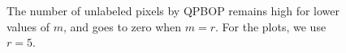 \documentclass[runningheads]{llncs}
\begin{document}
\begin{figure}[!htp]
\center
{}%
%
\caption{The number of unlabeled pixels by QPBOP remains high for lower values of $m$, and goes to zero when $m=r$. For the plots, we use $r=5$.}
\label{fig:unlabeled-versus-iterations}
\end{figure}
\end{document}
